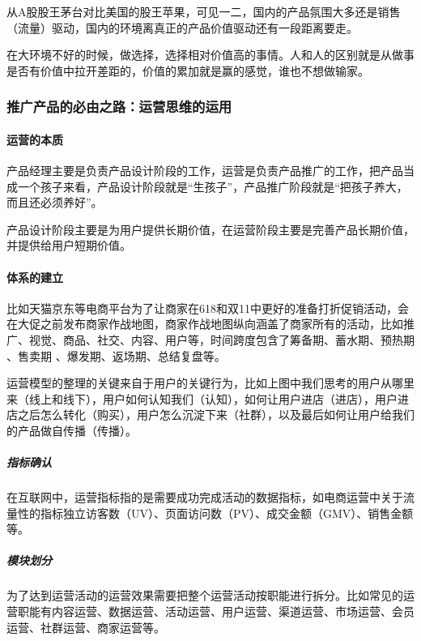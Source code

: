 \documentclass[letterpaper,11pt,english]{sphinxmanual}
\begin{document}
从A股股王茅台对比美国的股王苹果，可见一二，国内的产品氛围大多还是销售（流量）驱动，国内的环境离真正的产品价值驱动还有一段距离要走。

在大环境不好的时候，做选择，选择相对价值高的事情。人和人的区别就是从做事是否有价值中拉开差距的，价值的累加就是赢的感觉，谁也不想做输家。


\subsubsection{推广产品的必由之路：运营思维的运用}
\label{\detokenize{chapter_project/widespread:id1}}\label{\detokenize{chapter_project/widespread::doc}}

\paragraph{运营的本质}
\label{\detokenize{chapter_project/widespread:id2}}
产品经理主要是负责产品设计阶段的工作，运营是负责产品推广的工作，把产品当成一个孩子来看，产品设计阶段就是“生孩子”，产品推广阶段就是“把孩子养大，而且还必须养好”。

产品设计阶段主要是为用户提供长期价值，在运营阶段主要是完善产品长期价值，并提供给用户短期价值。


\paragraph{体系的建立}
\label{\detokenize{chapter_project/widespread:id3}}
比如天猫京东等电商平台为了让商家在618和双11中更好的准备打折促销活动，会在大促之前发布商家作战地图，商家作战地图纵向涵盖了商家所有的活动，比如推广、视觉、商品、社交、内容、用户等，时间跨度包含了筹备期、蓄水期、预热期
、售卖期 、爆发期、返场期、总结复盘等。

运营模型的整理的关键来自于用户的关键行为，比如上图中我们思考的用户从哪里来（线上和线下），用户如何认知我们（认知），如何让用户进店（进店），用户进店之后怎么转化（购买），用户怎么沉淀下来（社群），以及最后如何让用户给我们的产品做自传播（传播）。


\subparagraph{指标确认}
\label{\detokenize{chapter_project/widespread:id4}}
在互联网中，运营指标指的是需要成功完成活动的数据指标，如电商运营中关于流量性的指标独立访客数（UV）、页面访问数（PV）、成交金额（GMV）、销售金额等。


\subparagraph{模块划分}
\label{\detokenize{chapter_project/widespread:id5}}
为了达到运营活动的运营效果需要把整个运营活动按职能进行拆分。比如常见的运营职能有内容运营、数据运营、活动运营、用户运营、渠道运营、市场运营、会员运营、社群运营、商家运营等。
\end{document}
